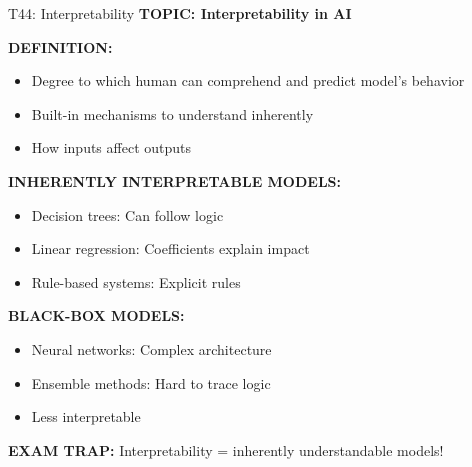 \documentclass[8pt]{beamer}
\begin{document}
	\begin{frame}{T44: Interpretability}
		\fontsize{6.5}{7.5}\selectfont
		\textbf{TOPIC: Interpretability in AI}
		
		\vspace{0.1cm}
		\textbf{DEFINITION:}
		\begin{itemize}
			\item Degree to which human can comprehend and predict model's behavior
			\item Built-in mechanisms to understand inherently
			\item How inputs affect outputs
		\end{itemize}
		
		\vspace{0.1cm}
		\textbf{INHERENTLY INTERPRETABLE MODELS:}
		\begin{itemize}
			\item Decision trees: Can follow logic
			\item Linear regression: Coefficients explain impact
			\item Rule-based systems: Explicit rules
		\end{itemize}
		
		\vspace{0.1cm}
		\textbf{BLACK-BOX MODELS:}
		\begin{itemize}
			\item Neural networks: Complex architecture
			\item Ensemble methods: Hard to trace logic
			\item Less interpretable
		\end{itemize}
		
		\textcolor{myred}{\textbf{EXAM TRAP:}} Interpretability = \textcolor{myblue}{inherently understandable models}!
	\end{frame}
	
\end{document}
